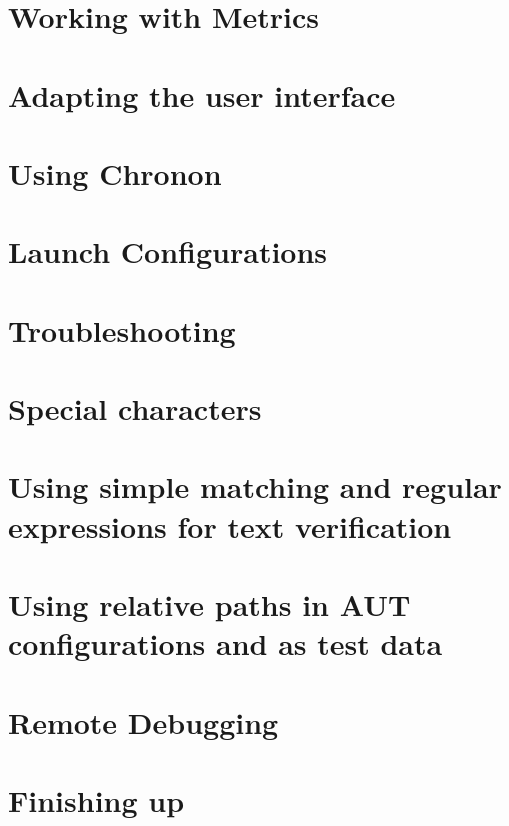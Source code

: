 \section{Working with Metrics}

\clearpage
\section{Adapting the user interface}

\clearpage
\section{Using Chronon}
\label{TasksChronon}
 
\clearpage
\section{Launch Configurations}
\label{LaunchConfigurations}

\clearpage
\section{Troubleshooting}

\clearpage
\section{Special characters}
\label{TasksSpecialChars}

\clearpage
\section{Using simple matching and regular expressions for text verification}
\label{TasksOperatorParameter}

\clearpage
\section{Using relative paths in AUT configurations and as test data}
\label{TasksRelativePaths}

\clearpage
\section{Remote Debugging}

\clearpage
\section{Finishing up}

